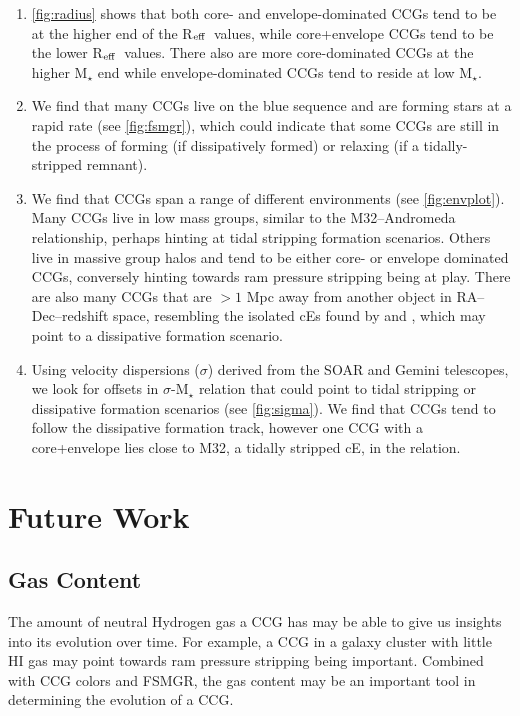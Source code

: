 \documentclass[iop,apj]{emulateapj}
\newcommand{\Reff}{R$_{\rm eff}$}
\begin{document}
\begin{enumerate}
\item \autoref{fig:radius} shows that both core- and envelope-dominated CCGs tend to be at the higher end of the \Reff\ values, while core+envelope CCGs tend to be the lower \Reff\ values. There also are more core-dominated CCGs at the higher M$_{\star}$ end while envelope-dominated CCGs tend to reside at low M$_{\star}$.

\item We find that many CCGs live on the blue sequence and are forming stars at a rapid rate (see \autoref{fig:fsmgr}), which could indicate that some CCGs are still in the process of forming (if dissipatively formed) or relaxing (if a tidally-stripped remnant).

\item We find that CCGs span a range of different environments (see \autoref{fig:envplot}). Many CCGs live in low mass groups, similar to the M32--Andromeda relationship, perhaps hinting at tidal stripping formation scenarios. Others live in massive group halos and tend to be either core- or envelope dominated CCGs, conversely hinting towards ram pressure stripping being at play. There are also many CCGs that are $>1$ Mpc away from another object in RA--Dec--redshift space, resembling the isolated cEs found by \citet{Huxor2013} and \citet{Paudel2014}, which may point to a dissipative formation scenario.

\item Using velocity dispersions ($\sigma$) derived from the SOAR and Gemini telescopes, we look for offsets in $\sigma$-M$_{\star}$ relation that could point to tidal stripping or dissipative formation scenarios (see \autoref{fig:sigma}). We find that CCGs tend to follow the dissipative formation track, however one CCG with a core+envelope lies close to M32, a tidally stripped cE, in the relation. 
\end{enumerate}

\section{Future Work}
\subsection{Gas Content}
\noindent The amount of neutral Hydrogen gas a CCG has may be able to give us insights into its evolution over time. For example, a CCG in a galaxy cluster with little HI gas may point towards ram pressure stripping being important. Combined with CCG colors and FSMGR, the gas content may be an important tool in determining the evolution of a CCG.
\end{document}
